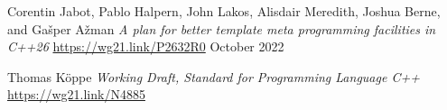\documentclass{wg21}
\begin{document}
\renewcommand{\section}[2]{}%



\begin{thebibliography}{9}

Corentin Jabot, Pablo Halpern, John Lakos, Alisdair Meredith, Joshua Berne, and Gašper Ažman\newline
\emph{A plan for better template meta programming facilities in C++26}\newline
\url{https://wg21.link/P2632R0}\newline
October 2022

Thomas Köppe
\emph{Working Draft, Standard for Programming Language C++}\newline
\url{https://wg21.link/N4885}


\end{thebibliography}
\end{document}
